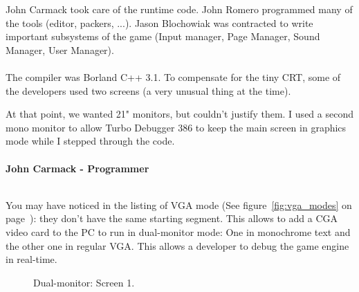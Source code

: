 \documentclass[book.tex]{subfiles}
\begin{document}
John Carmack took care of the runtime code. John Romero programmed many of the tools (editor, packers, ...). Jason Blochowiak was contracted to write important subsystems of the game (Input manager, Page Manager, Sound Manager, User Manager).\\
\\
The compiler was Borland C++ 3.1. To compensate for the tiny CRT, some of the developers used two screens (a very unusual thing at the time).\\
\begin{fancyquotes}
At that point, we wanted 21" monitors, but couldn't justify them.  I used a second mono monitor to allow Turbo Debugger 386 to keep the main screen in graphics mode while I stepped through the code.\\
 \\
\textbf{John Carmack - Programmer}
\end{fancyquotes}
\\
You may have noticed in the listing of VGA mode (See figure~\ref{fig:vga_modes} on page~\pageref{fig:vga_modes}): they don't have the same starting segment. This allows to add a CGA video card to the PC to run in dual-monitor mode: One in monochrome text and the other one in regular VGA. This allows a developer to debug the game engine in real-time.\\
\begin{figure}[H]
\centering
\caption{Dual-monitor: Screen 1.}
\label{fig:dm1}
\end{figure}
\end{document}

